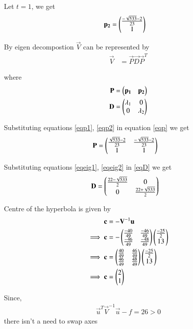 \documentclass[journal,12pt,twocolumn]{IEEEtran}
\begin{document}
Let $t=1$, we get 
\begin{align}
    \mathbf{p_2}&=\begin{pmatrix}\frac{-\sqrt{533}-2}{23} \\1 \end{pmatrix}\label{eqp2}
\end{align}

By eigen decompostion $\vec{V}$ can be represented by
\begin{align}
    \vec{V}&=\vec{P}\vec{D}\vec{P}^T\label{eqsubs}
\end{align}

where 
\begin{align}
        \mathbf{P}&=\begin{pmatrix}\mathbf{p_1} & \mathbf{p_2}\end{pmatrix}\label{eqp}\\
    \mathbf{D}&=\begin{pmatrix}\lambda_1 & 0 \\0 & \lambda_2\end{pmatrix}\label{eqD}
\end{align}

Substituting equations \ref{eqp1}, \ref{eqp2} in equation \ref{eqp} we get 
\begin{align}
    \mathbf{P}&=\begin{pmatrix}\frac{\sqrt{533}-2}{23} & \frac{-\sqrt{533}-2}{23} \\1 & 1\end{pmatrix}\label{eqP}
\end{align}

Substituting equations \ref{eqeig1}, \ref{eqeig2} in \ref{eqD} we get
\begin{align}
       \mathbf{D}&=\begin{pmatrix}\frac{22-\sqrt{533}}{2} & 0\\0 & \frac{22+\sqrt{533}}{2}\end{pmatrix}\label{eqDD}
\end{align}

Centre of the hyperbola is given by 
\begin{align}
    \mathbf{c}&=-\mathbf{V}^{-1}\mathbf{u}\\
    \implies\mathbf{c}&=-\begin{pmatrix}\frac{-40}{49}&\frac{-46}{49}\\\frac{-46}{49}&\frac{-48}{49}\end{pmatrix}\begin{pmatrix}\frac{-25}{2} \\ 13\end{pmatrix}\\
    \implies\mathbf{c}&=\begin{pmatrix}\frac{40}{49}&\frac{46}{49}\\\frac{46}{49}&\frac{48}{49}\end{pmatrix}\begin{pmatrix}\frac{-25}{2} \\ 13\end{pmatrix}\\
    \implies\mathbf{c}&=\begin{pmatrix}2\\1\end{pmatrix}
\end{align}

Since,
\begin{align}
    \vec{u}^T\vec{V}^{-1}\vec{u}-f = 26 > 0\label{cond}
\end{align} 
there isn't a need to swap axes
\end{document}
